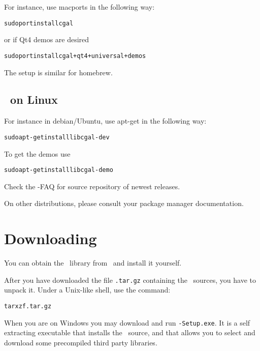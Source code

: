 For instance, use macports in the following way:

\begin{alltt}
 sudo port install cgal
\end{alltt}

or if Qt4 demos are desired

\begin{alltt}
 sudo port install cgal +qt4 +universal +demos
\end{alltt}

The setup is similar for homebrew.

\subsection{\cgal\ on Linux\label{ssec:cgaldebian}}

For instance in debian/Ubuntu, use apt-get in the following way:

\begin{alltt}
 sudo apt-get install libcgal-dev
\end{alltt}

To get the demos use

\begin{alltt}
 sudo apt-get install libcgal-demo
\end{alltt}

Check the \cgal-FAQ for source repository of newest releases.

On other distributions, please consult your package manager documentation.

\section{Downloading \cgal\label{sec:gettingcgal}}

You can obtain the \cgal\ library from \cgaldownloadpage\ and
install it yourself.

After you have downloaded the file \texttt{\cgalrel.tar.gz} containing the
\cgal\ sources, you have to unpack it. Under a Unix-like shell, use the
command:

\begin{alltt}
      tar xzf \cgalrel.tar.gz
\end{alltt}

When you are on Windows you may download and run \texttt{\cgalrel-Setup.exe}. It
is a self extracting executable that installs the \cgal\ source, and that allows
you to select and download some precompiled third party libraries.

